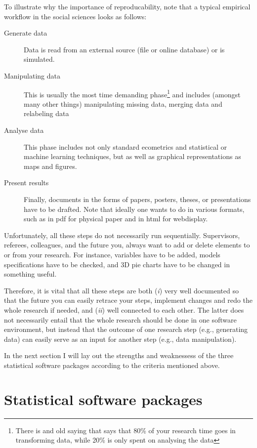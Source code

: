 \documentclass[fleqn,10pt]{SelfArx} %
\begin{document}
To illustrate why the importance of reproducability, note that a typical empirical workflow in the social sciences looks as follows:
\begin{description}
\item[Generate data] Data is read from an external source (file or online database) or is simulated.  
\item[Manipulating data] This is usually the most time demanding
  phase\footnote{There is and old saying that says that 80\% of your research time
  goes in transforming data, while 20\% is only spent on analysing the data} and
  includes (amongst many other things) manipulating missing data, merging data
  and relabeling data
\item[Analyse data] This phase includes not only standard ecometrics and
  statistical or machine learning techniques, but as well as graphical
  representations as maps and figures. 
\item[Present results] Finally, documents in the forms of papers, posters, theses, or
  presentations have to be drafted. Note that ideally one wants to do in various
  formats, such as in pdf for physical paper and in html for webdisplay. 
\end{description}
Unfortunately, all these steps do not necessarily run sequentially. Supervisors,
referees, colleagues, and the future you, always want to add or delete elements
to or from your research. For instance, variables have to be added,
models specifications have to be checked, and 3D pie charts have to be changed
in something useful.

Therefore, it is vital that all these steps are both (\emph{i}) very well
documented so that the future you can easily retrace your steps, implement
changes and redo the whole research if needed, and (\emph{ii}) well connected to
each other. The latter does not necessarily entail that the whole research
should be done in one software environment, but instead that the outcome of one
research step (e.g., generating data) can easily serve as an input for another
step (e.g., data manipulation).

In the next section I will lay out the strengths and weaknessess of the three
statistical software packages according to the criteria mentioned above. 
\section*{Statistical software packages}
\end{document}
